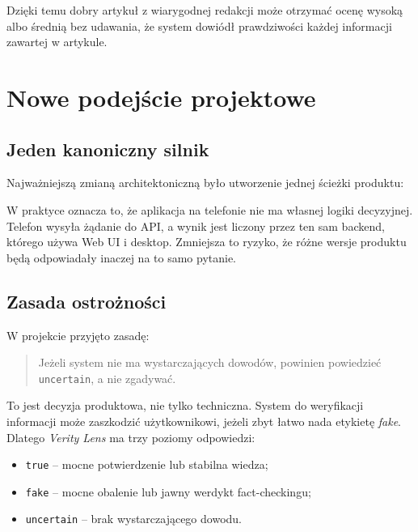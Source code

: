 \documentclass[12pt,a4paper]{article}
\begin{document}
Dzięki temu dobry artykuł z wiarygodnej redakcji może otrzymać ocenę wysoką albo średnią bez udawania, że system dowiódł prawdziwości każdej informacji zawartej w artykule.

\section{Nowe podejście projektowe}
\subsection{Jeden kanoniczny silnik}
Najważniejszą zmianą architektoniczną było utworzenie jednej ścieżki produktu:
\begin{center}
\end{center}

W praktyce oznacza to, że aplikacja na telefonie nie ma własnej logiki decyzyjnej.
Telefon wysyła żądanie do API, a wynik jest liczony przez ten sam backend, którego używa Web UI i desktop.
Zmniejsza to ryzyko, że różne wersje produktu będą odpowiadały inaczej na to samo pytanie.

\subsection{Zasada ostrożności}
W projekcie przyjęto zasadę:
\begin{quote}
Jeżeli system nie ma wystarczających dowodów, powinien powiedzieć \texttt{uncertain}, a nie zgadywać.
\end{quote}

To jest decyzja produktowa, nie tylko techniczna.
System do weryfikacji informacji może zaszkodzić użytkownikowi, jeżeli zbyt łatwo nada etykietę \textit{fake}.
Dlatego \textit{Verity Lens} ma trzy poziomy odpowiedzi:
\begin{itemize}
  \item \texttt{true} -- mocne potwierdzenie lub stabilna wiedza;
  \item \texttt{fake} -- mocne obalenie lub jawny werdykt fact-checkingu;
  \item \texttt{uncertain} -- brak wystarczającego dowodu.
\end{itemize}
\end{document}
